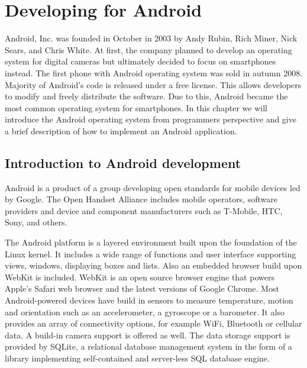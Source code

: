 
\chapter{Developing for Android}
\label{chap:android}

Android, Inc\@. was founded in October in 2003 by Andy Rubin, Rich Miner, Nick Sears, and Chris White. 
At first, the company planned to develop an operating system for digital cameras %
but ultimately %
decided to focus on smartphones instead. %
The first phone with Android operating system was sold in autumn 2008.
Majority of Android's code is released under a free license. 
This allows developers to modify and freely distribute the software.
Due to this, Android became the most common operating system for smartphones.
In this chapter we will introduce the Android operating system from programmers perspective and give a brief description of how to implement an Android application.

\section{Introduction to Android development}

Android is a product of a group developing open standards for mobile devices led by Google.
The Open Handset Alliance includes mobile operators, software providers and device and component manufacturers such as
T-Mobile, HTC, Sony, and others.

The Android platform is a layered environment built upon the foundation of the Linux kernel.
It includes a wide range of functions and user interface supporting views, windows, displaying boxes and lists.
Also an embedded browser build upon WebKit is included.
WebKit is an open source browser engine that powers Apple's Safari web browser and the latest versions of Google Chrome.
Most Android-powered devices have build in sensors to measure temperature, motion and orientation 
such as an accelerometer, a gyroscope or a barometer.
It also provides an array of connectivity options, for example WiFi, Bluetooth or cellular data.
A build-in camera support is offered as well.
The data storage support is provided by SQLite, a relational database management system in the form of a library implementing self-contained and server-less SQL database engine.
 

